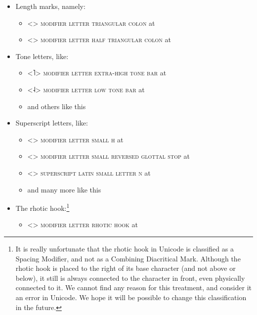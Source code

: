\begin{itemize}
  
	\item[] Length marks, namely: 
    	\begin{itemize}
    	  \item[] <> \textsc{modifier letter triangular colon} at 
    	  \item[] <> \textsc{modifier letter half triangular colon} at 
    	\end{itemize}
	 
	\item[] Tone letters, like: 
	\begin{itemize} 
	  \item[] <˥> \textsc{modifier letter extra-high tone bar} at 
	  \item[] <˨> \textsc{modifier letter low tone bar} at 
	  \item[] and others like this
	\end{itemize}
	
	\item[] Superscript letters, like:
	\begin{itemize}
	  \item[] <> \textsc{modifier letter small h} at 
	  \item[] <> \textsc{modifier letter small reversed glottal stop} at 
	  \item[] <> \textsc{superscript latin small letter n} at 
	  \item[] and many more like this
	\end{itemize}
	
	\item[] The rhotic hook:\footnote{It is really unfortunate that the rhotic hook
         in Unicode is classified as a Spacing Modifier, and not as a Combining 
         Diacritical Mark. Although the rhotic hook is placed to the right of its 
         base character (and not above or below), it still is always connected 
         to the character in front, even physically connected to it. We cannot 
         find any reason for this treatment, and consider it an error in 
         Unicode. We hope it will be possible to change this classification in 
         the future.}
	\begin{itemize}
	  \item[] <> \textsc{modifier letter rhotic hook} at 
	\end{itemize}
	
\end{itemize}

